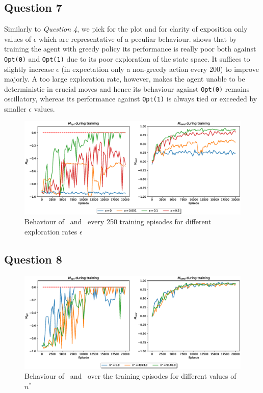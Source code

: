 \documentclass[10pt]{IEEEtran}
\begin{document}
\subsection*{Question 7}
Similarly to \emph{Question 4}, we pick for the plot and for clarity of exposition only values of $\epsilon$ which are representative of a peculiar behaviour.  shows that by training the agent with greedy policy its performance is really poor both against \texttt{Opt(0)} and \texttt{Opt(1)} due to its poor exploration of the state space. It suffices to slightly increase $\epsilon$ (in expectation only a non-greedy action every 200) to improve majorly. A too large exploration rate, however, makes the agent unable to be deterministic in crucial moves and hence its behaviour against \texttt{Opt(0)} remains oscillatory, whereas its performance against \texttt{Opt(1)} is always tied or exceeded by smaller $\epsilon$ values.
\begin{figure}[H]
    \centering
    \includegraphics[width=\linewidth]{code/figures/performance_epsilon_self.eps}
    \caption{Behaviour of \mopt\ and \mrand\ every 250 training episodes for different exploration rates $\epsilon$}
    \label{plot_question7}
\end{figure}


\subsection*{Question 8}
\begin{figure}[H]
    \centering
    \includegraphics[width=\linewidth]{code/figures/performance_n_star.eps}
    \caption{Behaviour of \mopt\ and \mrand\ over the training episodes for different values of $n^*$}
    \label{fig:my_label}
\end{figure}
\end{document}
